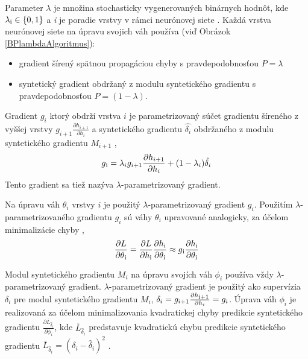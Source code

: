 Parameter $\lambda$ je množina stochasticky vygenerovaných binárnych hodnôt, kde $\lambda\textsubscript{i}\in\{0, 1\}$ a \textit{i} je poradie vrstvy v rámci neurónovej siete \cite{Jaderberg2016}. Každá vrstva neurónovej siete na úpravu svojich váh používa (viď Obrázok \ref{BPlambdaAlgoritmus}):
\begin{itemize}
    \item gradient šírený spätnou propagáciou chyby s pravdepodobnosťou $P=\lambda$
    \item syntetický gradient obdržaný z modulu syntetického gradientu s pravdepodobnosťou $P=(1-\lambda)$.
\end{itemize}
Gradient $g_i$ ktorý obdrží vrstva $i$ je parametrizovaný súčet gradientu šíreného z vyššej vrstvy $g_{i+1}\frac{\partial h_{i+1}}{\partial h_i}$ a syntetického gradientu $\hat{\delta_i}$ obdržaného z modulu syntetického gradientu $M_{i+1}$ \cite{Jaderberg2016},
\begin{equation}
\label{lambdaParametrizedGradient}
    g\textsubscript{i}=\lambda_i g_{i+1} \frac{\partial h_{i+1}}{\partial h_i}+(1-\lambda_i)\hat{\delta_i}
\end{equation}
Tento gradient sa tiež nazýva $\lambda$-parametrizovaný gradient.

Na úpravu váh $\theta_i$ vrstvy $i$ je použitý $\lambda$-parametrizovaný gradient $g_i$. Použitím $\lambda$-parametrizovaného gradientu $g_i$ sú váhy $\theta_i$ upravované analogicky, za účelom minimalizácie chyby \cite{Jaderberg2016},
\begin{equation}
    \frac{\partial L}{\partial \theta\textsubscript{i}}=\frac{\partial L}{\partial h\textsubscript{i}}\frac{\partial h\textsubscript{i}}{\partial\theta\textsubscript{i}}\approx g\textsubscript{i}\frac{\partial h\textsubscript{i}}{\partial \theta\textsubscript{i}}
\end{equation}

Modul syntetického gradientu $M_i$ na úpravu svojích váh $\phi_{i}$ používa vždy $\lambda$-parametrizovaný gradient. $\lambda$-parametrizovaný gradient je použitý ako supervízia $\delta_i$ pre modul syntetického gradientu $M_i$, $\delta_i=g_{i+1}\frac{\partial h\textsubscript{i+1}}{\partial h_i}=g_i$. Úprava váh $\phi_i$ je realizovaná za účelom minimalizovania kvadratickej chyby predikcie syntetického gradientu $\frac{\partial\bar{L}_{\hat{\delta}_i}}{\partial\phi_i}$, kde $\bar{L}_{\hat{\delta}_i}$ predstavuje kvadratickú chybu predikcie syntetického gradientu $\bar{L}_{\hat{\delta}_i}=(\delta_i-\hat{\delta}_i)^2$ \cite{Jaderberg2016}.

